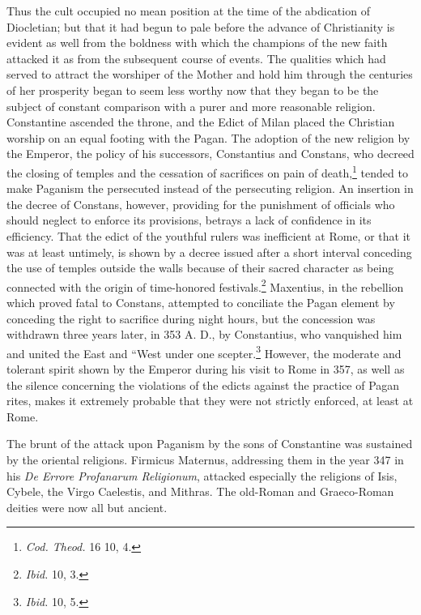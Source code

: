 \documentclass[a4paper, 11pt, oneside, polutonikogreek, english]{article}
\begin{document}
Thus the cult occupied no mean position at the time of the abdication of Diocletian; but that it had begun to pale before the advance of Christianity is evident as well from the boldness with which the champions of the new faith attacked it as from the subsequent course of events. The qualities which had served to attract the worshiper of the Mother and hold him through the centuries of her prosperity began to seem less worthy now that they began to be the subject of constant comparison with a purer and more reasonable religion. Constantine ascended the throne, and the Edict of Milan placed the Christian worship on an equal footing with the Pagan. The adoption of the new religion by the Emperor, the policy of his successors, Constantius and Constans, who decreed the closing of temples and the cessation of sacrifices on pain of death,\footnote{\emph{Cod. Theod.} 16 10, 4.} tended to make Paganism the persecuted instead of the persecuting religion. An insertion in the decree of Constans, however, providing for the punishment of officials who should neglect to enforce its provisions, betrays a lack of confidence in its efficiency. That the edict of the youthful rulers was inefficient at Rome, or that it was at least untimely, is shown by a decree issued after a short interval conceding the use of temples outside the walls because of their sacred character as being connected with the origin of time-honored festivals.\footnote{\emph{Ibid.} 10, 3.} Maxentius, in the rebellion which proved fatal to Constans, attempted to conciliate the Pagan element by conceding the right to sacrifice during night hours, but the concession was withdrawn three years later, in 353 A. D., by Constantius, who vanquished him and united the East and ``West under one scepter.\footnote{\emph{Ibid.} 10, 5.} However, the moderate and tolerant spirit shown by the Emperor during his visit to Rome in 357, as well as the silence concerning the violations of the edicts against the practice of Pagan rites, makes it extremely probable that they were not strictly enforced, at least at Rome.

The brunt of the attack upon Paganism by the sons of Constantine was sustained by the oriental religions. Firmicus Maternus, addressing them in the year 347 in his \emph{De Errore Profanarum Religionum}, attacked especially the religions of Isis, Cybele, the Virgo Caelestis, and Mithras. The old-Roman and Graeco-Roman deities were now all but ancient.
\end{document}
